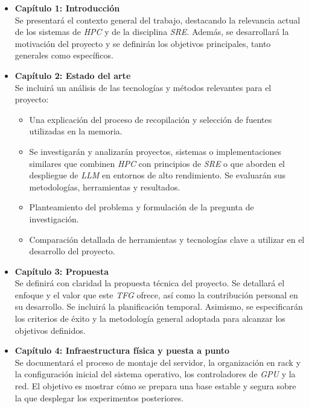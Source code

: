 \begin{itemize}
    \item \textbf{Capítulo 1: Introducción}\\
    Se presentará el contexto general del trabajo, destacando la relevancia actual de los sistemas de \textit{HPC} y de la disciplina \textit{SRE}. Además, se desarrollará la motivación del proyecto y se definirán los objetivos principales, tanto generales como específicos.
    \item \textbf{Capítulo 2: Estado del arte}\\
    Se incluirá un análisis de las tecnologías y métodos relevantes para el proyecto:
    \begin{itemize}
        \item Una explicación del proceso de recopilación y selección de fuentes utilizadas en la memoria.
        \item Se investigarán y analizarán proyectos, sistemas o implementaciones similares que combinen \textit{HPC} con principios de \textit{SRE} o que aborden el despliegue de \textit{LLM} en entornos de alto rendimiento. Se evaluarán sus metodologías, herramientas y resultados.
        \newpage
        \item Planteamiento del problema y formulación de la pregunta de investigación.
        \item Comparación detallada de herramientas y tecnologías clave a utilizar en el desarrollo del proyecto.
    \end{itemize}
    \item \textbf{Capítulo 3: Propuesta}\\
    Se definirá con claridad la propuesta técnica del proyecto. Se detallará el enfoque y el valor que este \textit{TFG} ofrece, así como la contribución personal en su desarrollo. Se incluirá la planificación temporal. Asimismo, se especificarán los criterios de éxito y la metodología general adoptada para alcanzar los objetivos definidos.
    \item \textbf{Capítulo 4: Infraestructura física y puesta a punto}\\
    Se documentará el proceso de montaje del servidor, la organización en rack y la configuración inicial del sistema operativo, los controladores de \textit{GPU} y la red. El objetivo es mostrar cómo se prepara una base estable y segura sobre la que desplegar los experimentos posteriores.

\end{itemize}

